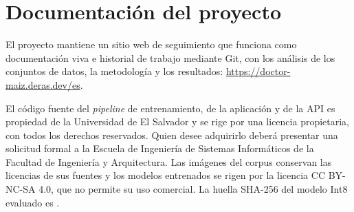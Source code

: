 \documentclass[conference,letterpaper]{IEEEtran}
\begin{document}
\section*{Documentación del proyecto}
El proyecto mantiene un sitio web de seguimiento que funciona como documentación viva e historial de trabajo mediante Git, con los análisis de los conjuntos de datos, la metodología y los resultados: \url{https://doctor-maiz.deras.dev/es}.

El código fuente del \textit{pipeline} de entrenamiento, de la aplicación y de la API es propiedad de la Universidad de El Salvador y se rige por una licencia propietaria, con todos los derechos reservados. Quien desee adquirirlo deberá presentar una solicitud formal a la Escuela de Ingeniería de Sistemas Informáticos de la Facultad de Ingeniería y Arquitectura. Las imágenes del corpus conservan las licencias de sus fuentes y los modelos entrenados se rigen por la licencia CC BY-NC-SA 4.0, que no permite su uso comercial. La huella SHA-256 del modelo Int8 evaluado es .



\end{document}
